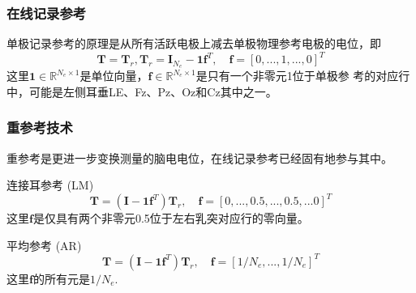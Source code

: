 \subsubsection{在线记录参考}
单极记录参考的原理是从所有活跃电极上减去单极物理参考电极的电位，即
\begin{equation}\label{eq2.4}
\mathbf{T}=\mathbf{T}_{r},\mathbf{T}_{r}=\mathbf{I}_{N_{e}}-\mathbf{1f}^T,\quad\mathbf{f}=[0,...,1,...,0]^T
\end{equation}
这里$\mathbf{1}\in{\mathbb{R}^{N_e\times1}}$是单位向量，$\mathbf{f}\in{\mathbb{R}^{N_e\times1}}$是只有一个非零元1位于单极参
考的对应行中，可能是左侧耳垂LE、Fz、Pz、Oz和Cz其中之一。

\subsubsection{重参考技术}
重参考是更进一步变换测量的脑电电位，在线记录参考已经固有地参与其中。

连接耳参考 (LM)
\begin{equation}\label{eq2.5}
\mathbf{T}=(\mathbf{I}-\mathbf{1f}^T)\mathbf{T}_r,\quad\mathbf{f}=[0,...,0.5,...,0.5,...0]^T
\end{equation}
这里$\mathbf{f}$是仅具有两个非零元0.5位于左右乳突对应行的零向量。

平均参考 (AR)
\begin{equation}\label{eq2.6}
\mathbf{T}=(\mathbf{I}-\mathbf{1f}^T)\mathbf{T}_r,\quad\mathbf{f}=[1/{N_e},...,1/{N_e}]^T
\end{equation}
这里$\mathbf{f}$的所有元是$1/{N_e}$.

